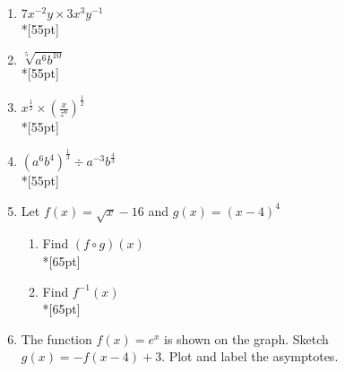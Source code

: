 \documentclass[]{book}
\begin{document}
\begin{enumerate}
\begin{figure}[!htbp]
\begin{center}
\begin{tikzpicture}
\end{tikzpicture}
\end{center}
\end{figure}

\newpage
\noindent BECA / Huson / 11.1 IB Math SL \hspace{2in} Name:\\*
20 November 2017
\begin{center}
{\Large Quiz Corrections: Exponents and radicals}\\
\textit{In addition to correcting your quiz, work these problems. Answer in the space provided.}
\end{center}



Simplify, leaving no negative or fractional exponents.



\item $7x^{-2}y \times 3x^3 y^{-1}$\\*[55pt]
\item $\sqrt[5]{a^6 b^{10}}$\\*[55pt]
\item $\displaystyle x^{\frac{1}{2}} \times (\frac{x}{z^6})^{\frac{1}{2}}$\\*[55pt]
\item $\displaystyle (a^6 b^4)^{\frac{1}{3}} \div a^{-3} b^\frac{4}{3}$\\*[55pt]

\newpage
\item Let $f(x) = \sqrt{x} -16$ and $g(x)=(x-4)^4$
\begin{enumerate}
    \item Find $(f \circ g)(x)$\\*[65pt]
    \item Find $f^{-1}(x)$\\*[65pt]
\end{enumerate}

\item The function $f(x)=e^x$ is shown on the graph. Sketch $g(x)=-f(x-4)+3$. Plot and label the asymptotes.

\begin{figure}[!htbp]
\begin{center}
\begin{tikzpicture}



\end{tikzpicture}
\end{center}
\end{figure}
\end{enumerate}
\end{document}
